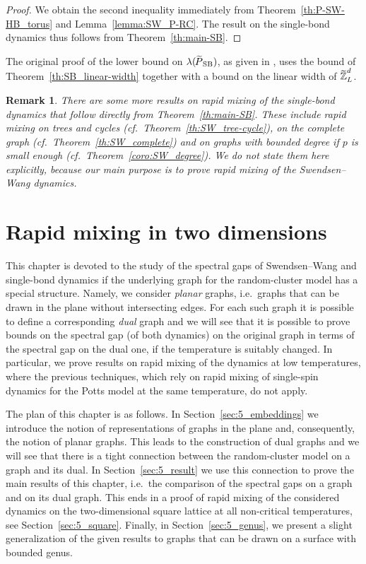 \documentclass{dis}
\newtheorem{remark}[theorem]{Remark}
\theoremstyle{citing}
\begin{document}
\begin{proof}
We obtain the second inequality immediately from 
Theorem~\ref{th:P-SW-HB_torus} and Lemma~\ref{lemma:SW_P-RC}. 
The result on the single-bond dynamics thus follows from 
Theorem~\ref{th:main-SB}.
\end{proof}
\vspace{1mm}

The original proof of the lower bound on $\lambda({{\raisebox{2pt}{ ${\widetilde{{}}}$ }\mkern-14mu P}_{\rm SB}})$, as given in 
\cite{U3}, uses the bound of Theorem~\ref{th:SB_linear-width} 
together with a bound on the linear width of ${\raisebox{2pt}{ ${\widetilde{{}}}$ }\mkern-12mu {\ensuremath{\mathbb{Z}}}}_L^d$.

\begin{remark}
There are some more results on rapid mixing of the single-bond 
dynamics that follow directly from 
Theorem~\ref{th:main-SB}. These include rapid mixing 
on trees and cycles (cf.~Theorem~\ref{th:SW_tree-cycle}), 
on the complete graph (cf.~Theorem~\ref{th:SW_complete}) and 
on graphs with bounded degree if $p$ is small enough  
(cf.~Theorem~\ref{coro:SW_degree}). 
We do not state them here explicitly, 
because our main purpose is to prove rapid mixing of the
Swendsen--Wang dynamics.
\end{remark}

\chapter{Rapid mixing in two dimensions} \label{chap:2d}

This chapter is devoted to the study of the spectral gaps of 
Swendsen--Wang and single-bond dynamics if the underlying graph 
for the random-cluster model has a special structure.
Namely, we consider \emph{planar} graphs, i.e.~graphs that 
can be drawn in the plane without intersecting edges.
For each such graph it is possible to define a corresponding 
\emph{dual} graph and we will see that it is possible to 
prove bounds on the spectral gap (of both dynamics) on the 
original graph in terms of the spectral gap on the dual one, 
if the temperature is suitably changed.
In particular, we prove results on rapid mixing of the dynamics 
at low temperatures, where the previous techniques, 
which rely on rapid mixing of single-spin dynamics for the 
Potts model at the same temperature, do not apply.

The plan of this chapter is as follows.
In Section~\ref{sec:5_embeddings} we introduce the notion of 
representations of graphs in the plane and, consequently, 
the notion of planar graphs. This leads to the construction of 
dual graphs and we will see that there is a tight connection between 
the random-cluster model on a graph and its dual. 
In Section~\ref{sec:5_result} we use this connection to 
prove the main results of this chapter, i.e.~the 
comparison of the spectral gaps on a graph and on its dual graph.
This ends in a proof of rapid mixing of the considered 
dynamics on the two-dimensional square lattice at all 
non-critical temperatures, see Section~\ref{sec:5_square}.
Finally, in Section~\ref{sec:5_genus}, we present a slight 
generalization of the given results to graphs that can be drawn 
on a surface with bounded genus.
\end{document}
